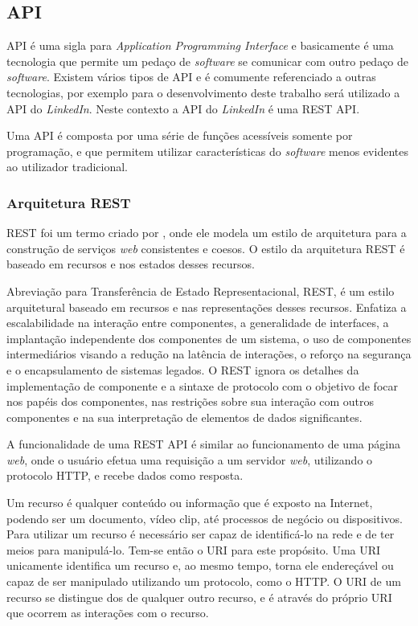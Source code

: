\subsection{API}
API é uma sigla para \textit{Application Programming Interface} e basicamente é uma tecnologia que permite um pedaço de \textit{software} se comunicar com outro pedaço de \textit{software}. Existem vários tipos de API e é comumente referenciado a outras tecnologias, por exemplo para o desenvolvimento deste trabalho será utilizado a API do \textit{LinkedIn}. Neste contexto a API do \textit{LinkedIn} é uma REST API.

Uma API é composta por uma série de funções acessíveis somente por programação, e que permitem utilizar características do \textit{software} menos evidentes ao utilizador tradicional.


\subsubsection{Arquitetura REST}
REST foi um termo criado por , onde ele modela um estilo de arquitetura para a construção de serviços \textit{web} consistentes e coesos. O estilo da arquitetura REST é baseado em recursos e nos estados desses recursos.

Abreviação para Transferência de Estado Representacional, REST, é um estilo arquitetural baseado em recursos e nas representações desses recursos. Enfatiza a escalabilidade na interação entre componentes, a generalidade de interfaces, a implantação independente dos componentes de um sistema, o uso de componentes intermediários visando a redução na latência de interações, o reforço na segurança e o encapsulamento de sistemas legados. O REST ignora os detalhes da implementação de componente e a sintaxe de protocolo com o objetivo de focar nos papéis dos componentes, nas restrições sobre sua interação com outros componentes e na sua interpretação de elementos de dados significantes. \cite{rest}

A funcionalidade de uma REST API é similar ao funcionamento de uma página \textit{web}, onde o usuário efetua uma requisição a um servidor \textit{web}, utilizando o protocolo HTTP, e recebe dados como resposta.

Um recurso é qualquer conteúdo ou informação que é exposto na Internet, podendo ser um documento, vídeo clip, até processos de negócio ou dispositivos. Para utilizar um recurso é necessário ser capaz de identificá-lo na rede e de ter meios para manipulá-lo. Tem-se então o URI para este propósito. Uma URI unicamente identifica um recurso e, ao mesmo tempo, torna ele endereçável ou capaz de ser manipulado utilizando um protocolo, como o HTTP. O URI de um recurso se distingue dos de qualquer outro recurso, e é através do próprio URI que ocorrem as interações com o recurso. \cite{rest-book}

